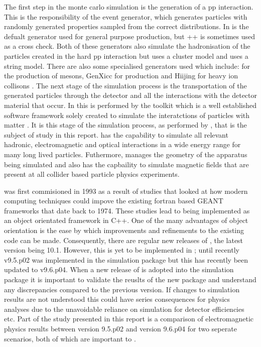 The first step in the monte carlo simulation is the generation of a pp interaction.  This is the responsibility of the event generator, which generates particles with randomly generated properties sampled from the correct distributions.  In \lhcb \pythia is the defualt generator used for general purpose production, but \herwig++ is sometimes used as a cross check\cite{Sjostrand:2007gs,Herwig}.  Both of these generators also simulate the hadronisation of the particles created in the hard pp interaction but \herwig uses a cluster model and \pythia uses a string model.  There are also some specialised generators used which include: \bcvegpy for the production of \Bc mesons, GenXicc for \Xic production and Hiijing for heavy ion collisons \cite{bcvegpy,Gyulassy:1994ew,Chang:2007pp}.
The next stage of the simulation process is the transportation of the generated particles through the detector and all the interactions with the detector material that occur.  In \lhcb this is performed by the \geant toolkit which is a well established software framework solely created to simulate the interatctions of particles with matter \cite{Agostinelli:2002hh}.  It is this stage of the simulation process, as performed by \geant, that is the subject of study in this report.  \geant has the capability to simulate all relevant hadronic, electromagnetic and optical interactions in a wide energy range for many long lived particles. Futhermore, \geant manages the geometry of the apparatus being simulated and also has the capbaility to simulate magnetic fields that are present at all collider based particle physics experiments.

\geant was first commisioned in 1993 as a result of studies that looked at how modern computing techniques could impove the existing fortran based GEANT frameworks that date back to 1974\cite{Agostinelli:2002hh,Brun:118715}.  These studies lead to \geant being implemented as an object orientated framework in C++.  One of the many advantages of object orientation is the ease by which improvements and refinements to the existing code can be made.  Consequently, there are regular new releases of \geant, the latest version being 10.1\cite{g410.1rn}. However, this is yet to be implemented in \lhcb; until recently \geant v9.5.p02 was implemented in the \lhcb simulation package but this has recently been updated to v9.6.p04.  When a new release of \geant is adopted into the \lhcb simulation package it is important to validate the reuslts of the new package and understand any discrepancies compared to the previous version.  If changes to simulation results are not understood this could have series consequences for physics analyses due to the unavoidable reliance on simulation for detector efficiencies etc.  Part of the study presented in this report is a comparison of electromagnetic physics results between \geant version 9.5.p02 and version 9.6.p04 for two seperate scenarios, both of which are important to \lhcb.

